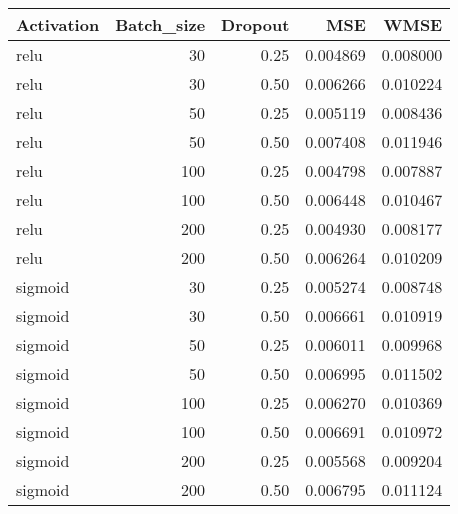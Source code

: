 \begin{tabular}{lrrrr}
\toprule
Activation &  Batch\_size &  Dropout &      MSE &     WMSE \\
\midrule
      relu &          30 &     0.25 & 0.004869 & 0.008000 \\
      relu &          30 &     0.50 & 0.006266 & 0.010224 \\
      relu &          50 &     0.25 & 0.005119 & 0.008436 \\
      relu &          50 &     0.50 & 0.007408 & 0.011946 \\
      relu &         100 &     0.25 & 0.004798 & 0.007887 \\
      relu &         100 &     0.50 & 0.006448 & 0.010467 \\
      relu &         200 &     0.25 & 0.004930 & 0.008177 \\
      relu &         200 &     0.50 & 0.006264 & 0.010209 \\
   sigmoid &          30 &     0.25 & 0.005274 & 0.008748 \\
   sigmoid &          30 &     0.50 & 0.006661 & 0.010919 \\
   sigmoid &          50 &     0.25 & 0.006011 & 0.009968 \\
   sigmoid &          50 &     0.50 & 0.006995 & 0.011502 \\
   sigmoid &         100 &     0.25 & 0.006270 & 0.010369 \\
   sigmoid &         100 &     0.50 & 0.006691 & 0.010972 \\
   sigmoid &         200 &     0.25 & 0.005568 & 0.009204 \\
   sigmoid &         200 &     0.50 & 0.006795 & 0.011124 \\
\bottomrule
\end{tabular}
